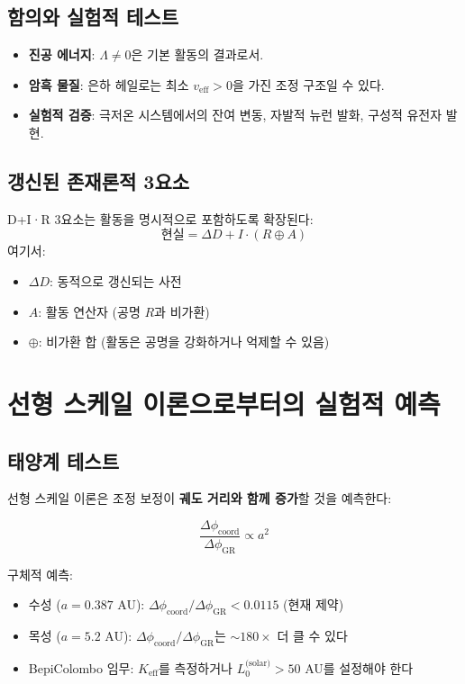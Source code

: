 \documentclass[11pt,a4paper]{article}
\begin{document}
\subsection{함의와 실험적 테스트}

\begin{itemize}
\item \textbf{진공 에너지}: $\Lambda \neq 0$은 기본 활동의 결과로서.
\item \textbf{암흑 물질}: 은하 헤일로는 최소 $v_{\mathrm{eff}} > 0$을 가진 조정 구조일 수 있다.
\item \textbf{실험적 검증}: 극저온 시스템에서의 잔여 변동, 자발적 뉴런 발화, 구성적 유전자 발현.
\end{itemize}

\subsection{갱신된 존재론적 3요소}

D+I·R 3요소는 활동을 명시적으로 포함하도록 확장된다:
\[
\boxed{\mathrm{현실} = \Delta D + I \cdot (R \oplus A)}
\]
여기서:
\begin{itemize}
\item $\Delta D$: 동적으로 갱신되는 사전
\item $A$: 활동 연산자 (공명 $R$과 비가환)
\item $\oplus$: 비가환 합 (활동은 공명을 강화하거나 억제할 수 있음)
\end{itemize}

\section{선형 스케일 이론으로부터의 실험적 예측}
\label{sec:scale-predictions}

\subsection{태양계 테스트}

선형 스케일 이론은 조정 보정이 \textbf{궤도 거리와 함께 증가}할 것을 예측한다:

\begin{equation}
\frac{\Delta\phi_{\text{coord}}}{\Delta\phi_{\text{GR}}} \propto a^2
\end{equation}

구체적 예측:
\begin{itemize}
\item 수성 ($a = 0.387$ AU): $\Delta\phi_{\text{coord}}/\Delta\phi_{\text{GR}} < 0.0115$ (현재 제약)
\item 목성 ($a = 5.2$ AU): $\Delta\phi_{\text{coord}}/\Delta\phi_{\text{GR}}$는 $\sim 180\times$ 더 클 수 있다
\item BepiColombo 임무: $K_{\mathrm{eff}}$를 측정하거나 $L_0^{\text{(solar)}} > 50$ AU를 설정해야 한다
\end{itemize}
\end{document}

